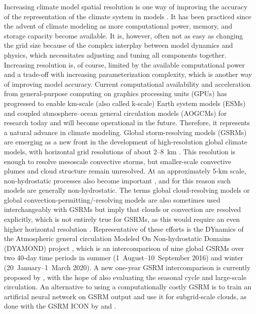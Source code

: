 \documentclass[draft]{agujournal2019}
\begin{document}
Increasing climate model spatial resolution is one way of improving the accuracy of the representation of the climate system in models \cite{mauritsen2022}. It has been practiced since the advent of climate modeling as more computational power, memory, and storage capacity become available. It is, however, often not as easy as changing the grid size because of the complex interplay between model dynamics and physics, which necessitates adjusting and tuning all components together. Increasing resolution is, of course, limited by the available computational power and a trade-off with increasing parameterization complexity, which is another way of improving model accuracy. Current computational availability and acceleration from general-purpose computing on graphics processing units (GPUs) has progressed to enable km-scale (also called k-scale) Earth system models (ESMs) and coupled atmosphere--ocean general circulation models (AOGCMs) for research today and will become operational in the future. Therefore, it represents a natural advance in climate modeling. Global storm-resolving models (GSRMs) are emerging as a new front in the development of high-resolution global climate models, with horizontal grid resolutions of about 2--8~km \cite{satoh2019,stevens2019}. This resolution is enough to resolve mesoscale convective storms, but smaller-scale convective plumes and cloud structure remain unresolved. At an approximately 5-km scale, non-hydrostatic processes also become important \cite{weisman1997}, and for this reason such models are generally non-hydrostatic. The terms global cloud-resolving models or global convection-permitting/-resolving models are also sometimes used interchangeably with GSRMs but imply that clouds or convection are resolved explicitly, which is not entirely true for GSRMs, as this would require an even higher horizontal resolution \cite{satoh2019}. Representative of these efforts is the DYnamics of the Atmospheric general circulation Modeled On Non-hydrostatic Domains (DYAMOND) project \cite{stevens2019,dyamond}, which is an intercomparison of nine global GSRMs over two 40-day time periods in summer (1~August--10~September 2016) and winter (20~January--1~March 2020). A new one-year GSRM intercomparison is currently proposed by , with the hope of also evaluating the seasonal cycle and large-scale circulation. An alternative to using a computationally costly GSRM is to train an artificial neural network on GSRM output and use it for subgrid-scale clouds, as done with the GSRM ICON by  and .
\end{document}

